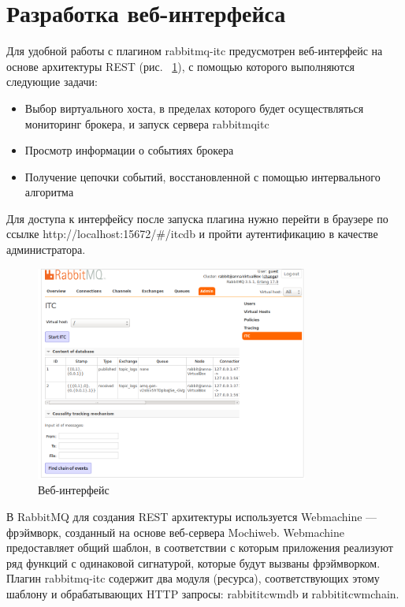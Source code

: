 {\section{Разработка веб-интерфейса}
Для удобной работы с плагином rabbitmq-itc предусмотрен веб-интерфейс  на основе архитектуры REST (рис. ~\ref{fig:web}), с помощью которого выполняются следующие задачи:
\begin{itemize}
\item Выбор виртуального хоста, в пределах которого будет осуществляться мониторинг брокера, и запуск сервера rabbitmq\underline{\hspace{0.25cm}}itc
\item Просмотр информации о событиях брокера
\item Получение цепочки событий, восстановленной с помощью интервального алгоритма
\end{itemize}
Для доступа к интерфейсу после запуска плагина нужно перейти в браузере по ссылке  http://localhost:15672/\#/itc\underline{\hspace{0.25cm}}db и пройти аутентификацию в качестве администратора.

\begin{figure}
\centering
\includegraphics[width=0.8\textwidth]{img/web.png}
\caption{Веб-интерфейс}
\label{fig:web}
\end{figure}
В RabbitMQ для создания REST архитектуры используется Webmachine --- фрэймворк, созданный на основе веб-сервера Mochiweb. Webmachine предоставляет общий шаблон, в соответствии с которым приложения реализуют ряд функций с одинаковой сигнатурой, которые будут вызваны фрэймворком. Плагин rabbitmq-itc содержит два модуля (ресурса), соответствующих этому шаблону и обрабатывающих HTTP запросы: rabbit\underline{\hspace{0.25cm}}itc\underline{\hspace{0.25cm}}wm\underline{\hspace{0.25cm}}db и rabbit\underline{\hspace{0.25cm}}itc\underline{\hspace{0.25cm}}wm\underline{\hspace{0.25cm}}chain.

}
